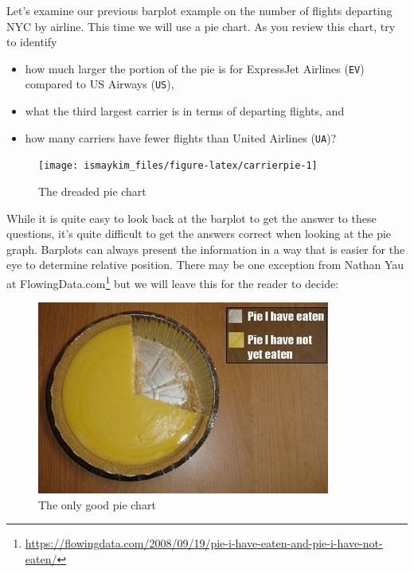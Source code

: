 \documentclass[12pt,]{krantz}
\providecommand{\tightlist}{%
  \setlength{\itemsep}{0pt}\setlength{\parskip}{0pt}}
\renewcommand{\href}[2]{#2\footnote{\url{#1}}}
\theoremstyle{definition}
\theoremstyle{definition}
\theoremstyle{definition}
\theoremstyle{remark}
\begin{document}
Let's examine our previous barplot example on the number of flights
departing NYC by airline. This time we will use a pie chart. As you
review this chart, try to identify

\begin{itemize}
\tightlist
\item
  how much larger the portion of the pie is for ExpressJet Airlines
  (\texttt{EV}) compared to US Airways (\texttt{US}),
\item
  what the third largest carrier is in terms of departing flights, and
\item
  how many carriers have fewer flights than United Airlines
  (\texttt{UA})?
\end{itemize}

\begin{figure}

{\centering \texttt{[image: ismaykim\_files/figure-latex/carrierpie-1]} 

}

\caption{The dreaded pie chart}\label{fig:carrierpie}
\end{figure}

While it is quite easy to look back at the barplot to get the answer to
these questions, it's quite difficult to get the answers correct when
looking at the pie graph. Barplots can always present the information in
a way that is easier for the eye to determine relative position. There
may be one exception from Nathan Yau at
\href{https://flowingdata.com/2008/09/19/pie-i-have-eaten-and-pie-i-have-not-eaten/}{FlowingData.com}
but we will leave this for the reader to decide:

\begin{figure}

{\centering \includegraphics[width=\textwidth,height=2.5in]{images/Pie-I-have-Eaten} 

}

\caption{The only good pie chart}\label{fig:unnamed-chunk-49}
\end{figure}
\end{document}
